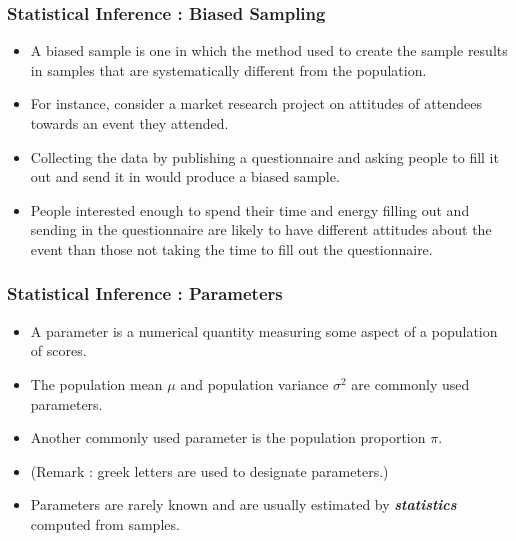 \documentclass[a4]{beamer}
\begin{document}
\begin{frame}
\frametitle{Statistical Inference : Biased Sampling}
\begin{itemize}


\item A biased sample is one in which the method used to create the sample results
in samples that are systematically different from the population.


\item For instance, consider a market research project on attitudes of attendees towards an event they attended.

\item Collecting the data by publishing a questionnaire and asking people to fill it out and
send it in would produce a biased sample.

\item People interested enough to spend their time and energy filling out and sending in the questionnaire
are likely to have different attitudes about the event than those not taking the time to fill out the questionnaire.

\end{itemize}
\end{frame}





\begin{frame}
\frametitle{Statistical Inference : Parameters}
\begin{itemize}
\item A parameter is a numerical quantity measuring some aspect of a population of scores.
\item The population mean $\mu$ and population variance $\sigma^2$ are commonly used parameters.
\item Another commonly used parameter is the population proportion $\pi$.
\item (Remark : greek letters are used to designate parameters.)
\item Parameters are rarely known and are usually estimated by \textbf{\emph{statistics}} computed from samples.
\end{itemize}
\end{frame}


\end{document}
